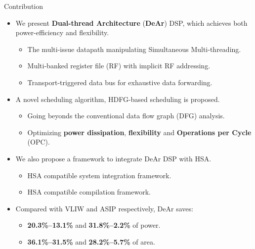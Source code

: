 \documentclass{beamer}
\begin{document}
\begin{CJK}{UTF8}{bkai}
    \begin{frame}{Contribution}
        \begin{itemize}
            \item {
                    We present \textbf{Dual-thread Architecture} (\textbf{DeAr}) DSP, which achieves both power-efficiency and flexibility.
                    \begin{itemize}
                        \item {
                                The multi-issue datapath manipulating Simultaneous Multi-threading.
                            }
                        \item {
                                Multi-banked register file (RF) with implicit RF addressing.
                            }
                        \item {
                                Transport-triggered data bus for exhaustive data forwarding.
                            }
                        \end{itemize}
                }
            \item {
                    A novel scheduling algorithm, HDFG-based scheduling is proposed.
                    \begin{itemize}
                        \item Going beyonds the conventional data flow graph (DFG) analysis.
                        \item Optimizing \textbf{power dissipation}, \textbf{flexibility} and \textbf{Operations per Cycle} (OPC).
                    \end{itemize}
                }
            \item {
                    We also propose a framework to integrate DeAr DSP with HSA.
                    \begin{itemize}
                        \item {
                                HSA compatible system integration framework.
                            }
                        \item {
                                HSA compatible compilation framework.
                            }
                        \end{itemize}
                }
            \item{
                    Compared with VLIW and ASIP respectively, DeAr saves: 
                    \begin{itemize}
                        \item {
                                \textbf{20.3\%--13.1\%} and \textbf{31.8\%--2.2\%} of power.
                            }
                        \item {
                                \textbf{36.1\%--31.5\%} and \textbf{28.2\%--5.7\%} of area.
                            }
                        \end{itemize}
                }
        \end{itemize}
    \end{frame}


\end{CJK}
\end{document}
